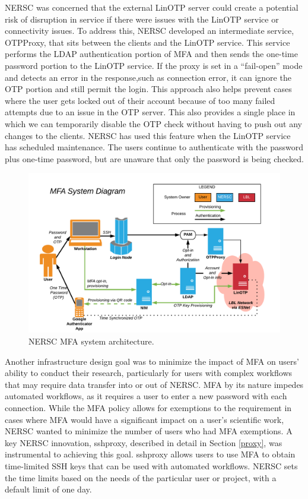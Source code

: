 \documentclass[sigconf,review]{acmart}
\begin{document}
NERSC was concerned that the external LinOTP server could create a potential
risk of disruption in service if there were issues with the LinOTP service or
connectivity issues.  To address this, NERSC developed an intermediate service,
OTPProxy, that sits between the clients and the LinOTP service.  This service
performs the LDAP authentication portion of MFA and then sends the one-time
password portion to the LinOTP service.  If the proxy is set in a ``fail-open''
mode and detects an error in the response,such as connection error, it can
ignore the OTP portion and still permit the login.  This approach also helps
prevent cases where the user gets locked out of their account because of too
many failed attempts due to an issue in the OTP server.  This also provides a
single place in which we can temporarily disable the OTP check without having to
push out any changes to the clients.  NERSC has used this feature when the
LinOTP service has scheduled maintenance.  The users continue to authenticate
with the password plus one-time password, but are unaware that only the password
is being checked.

\begin{figure}[h!]
  \centering
  \includegraphics[width=\textwidth]{nersc-mfa.png}
  \caption{NERSC MFA system architecture.}
  \label{mfa-diagram}
\end{figure}

Another infrastructure design goal was to minimize the impact of MFA on users'
ability to conduct their research, particularly for users with complex workflows
that may require data transfer into or out of NERSC. MFA by its nature impedes
automated workflows, as it requires a user to enter a new password with each
connection. While the MFA policy allows for exemptions to the requirement in
cases where MFA would have a significant impact on a user's scientific work,
NERSC wanted to minimize the number of users who had MFA exemptions. A key NERSC
innovation, sshproxy, described in detail in Section \ref{proxy}, was
instrumental to achieving this goal. sshproxy allows users to use MFA to obtain
time-limited SSH keys that can be used with automated workflows. NERSC sets the
time limits based on the needs of the particular user or project, with a default
limit of one day.
\end{document}
